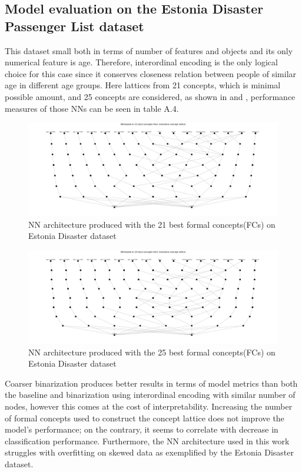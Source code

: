 \documentclass[14pt,a4paper]{extarticle}
\begin{document}
	\subsection{Model evaluation on the Estonia Disaster Passenger List dataset}
	
	This dataset small both in terms of number of features and objects and its only numerical feature is age. Therefore, interordinal encoding is the only logical choice for this case since it conserves closeness relation between people of similar age in different age groups. Here lattices from 21 concepts, which is minimal possible amount, and 25 concepts are considered, as shown in  and , performance measures of those NNs can be seen in table A.4.
	
	\begin{figure}[h]
		\centering
		\includegraphics[width=\textwidth]{media/eesti/NN_architecture_21concepts.png}
		\caption{NN architecture produced with the 21 best formal concepts(FCs) on Estonia Disaster dataset}
		\label{fig:21concepts}
	\end{figure}
	
	\begin{figure}[h]
		\centering
		\includegraphics[width=\textwidth]{media/eesti/NN_architecture_25concepts.png}
		\caption{NN architecture produced with the 25 best formal concepts(FCs) on Estonia Disaster dataset}
		\label{fig:25concepts}
	\end{figure}
	
	\begin{results}
		
		Coarser binarization produces better results in terms of model metrics than both the baseline and binarization using interordinal encoding with similar number of nodes, however this comes at the cost of interpretability. Increasing the number of formal concepts used to construct the concept lattice does not improve the model's performance; on the contrary, it seems to correlate with decrease in classification performance. Furthermore, the NN architecture used in this work struggles with overfitting on skewed data as exemplified by the Estonia Disaster dataset.
		
	\end{results}
	
\end{document}
